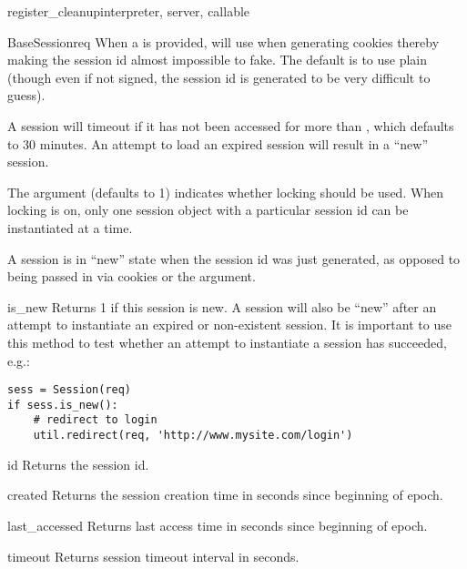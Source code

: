 \begin{funcdesc}{register_cleanup}{interpreter, server, callable}
\begin{classdesc}{BaseSession}{req}
  When a  is provided,  will use
   when generating cookies thereby making the
  session id almost impossible to fake. The default is to use plain
   (though even if not signed, the session id is
  generated to be very difficult to guess).

  A session will timeout if it has not been accessed for more than
  , which defaults to 30 minutes. An attempt to load an
  expired session will result in a ``new'' session.

  The  argument (defaults to 1) indicates whether locking
  should be used. When locking is on, only one session object with a
  particular session id can be instantiated at a time.

  A session is in ``new'' state when the session id was just
  generated, as opposed to being passed in via cookies or the
   argument.


  \begin{methoddesc}[BaseSession]{is_new}{}
    Returns 1 if this session is new. A session will also be ``new''
    after an attempt to instantiate an expired or non-existent
    session. It is important to use this method to test whether an
    attempt to instantiate a session has succeeded, e.g.:
    \begin{verbatim}
sess = Session(req)
if sess.is_new():
    # redirect to login
    util.redirect(req, 'http://www.mysite.com/login')
    \end{verbatim}
  \end{methoddesc}

  \begin{methoddesc}[BaseSession]{id}{}
    Returns the session id.
  \end{methoddesc}

  \begin{methoddesc}[BaseSession]{created}{}
    Returns the session creation time in seconds since beginning of
    epoch.
  \end{methoddesc}

  \begin{methoddesc}[BaseSession]{last_accessed}{}
    Returns last access time in seconds since beginning of epoch.
  \end{methoddesc}

  \begin{methoddesc}[BaseSession]{timeout}{}
    Returns session timeout interval in seconds.
  \end{methoddesc}


\end{classdesc}
\end{funcdesc}
